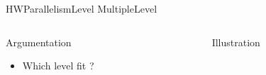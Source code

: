 %
\begin{Frame}{HWParallelismLevel MultipleLevel}

  \begin{columns}[t]
    \begin{column}{5cm} %
      \begin{block}{Argumentation}
        \begin{itemize}
        \item Which level fit ?
        \end{itemize}
      \end{block} 
    \end{column}
    
    \begin{column}{5cm} %
      \begin{block}{Illustration}
      \end{block}   
    \end{column}
  \end{columns}  
\end{Frame}


